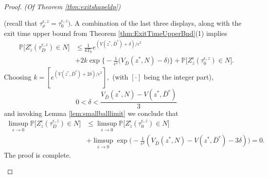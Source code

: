 \documentclass[10pt, reqno]{amsart}
\newcommand{\pr}{\mathbb{P}}
\theoremstyle{definition}
\numberwithin{lem}{section}
\numberwithin{cor}{section}
\numberwithin{prop}{section}
\numberwithin{thm}{section}
\numberwithin{dfn}{section}
\begin{document}
\begin{proof}{\textit{(Of Theorem \ref{thm:exitshapeldp})}}
\begin{enumerate}
\begin{equation*}
    \end{equation*}
   (recall that $\tau^{\epsilon,z}_\rho=\tau^{\epsilon,z}_0).$  A combination of the last three displays, along with the exit time upper bound from Theorem \ref{thm:ExitTimeUpperBnd}(1)
    implies 
\begin{equation*}
    \begin{aligned}
        \pr\bigg[  Z^\epsilon_z(\tau_D^{\epsilon, z})\in N   \bigg]&\leq \frac{1}{kT_0}e^{(V(z^*, \bar{D}^c)+\delta   )/\epsilon^2}  \\&  +    2k\exp\bigg\{-\frac{1}{\epsilon^2}\bigg( V_{\bar{D}}(z^*,N)-\delta\bigg)\bigg\}+ \pr\bigg[ Z^\epsilon_z(\tau_{0}^{\epsilon, z})\in N \bigg].
    \end{aligned}
\end{equation*}
Choosing $k=[e^{(V(z^*,\bar{D}^c)+2\delta   )/\epsilon^2}],$ (with $[\cdot]$ being the integer part), $$ 
0<\delta<\frac{V_{\bar{D}}(z^*, N)- V(z^*,\bar{D}^c)}{3}$$ and invoking Lemma \ref{lem:smallballlimit} we conclude that 
   \begin{equation*}
    \begin{aligned}
        \limsup_{\epsilon\to 0} \pr\bigg[  Z^\epsilon_z(\tau_D^{\epsilon, z})\in N   \bigg]&\leq \limsup_{\epsilon\to 0}\pr\bigg[ Z^\epsilon_z(\tau_{0}^{\epsilon, z})\in N \bigg]\\&+\limsup_{\epsilon\to 0}\exp\bigg(-\frac{1}{\epsilon^2}(V_{\bar{D}}(z^*, N)-V(z^*,\bar{D}^c)-3\delta   )\bigg)=0.
     \end{aligned}
\end{equation*}
The proof is complete.
    
    
    
    
    
    
    

\end{enumerate}
\end{proof}
\end{document}
